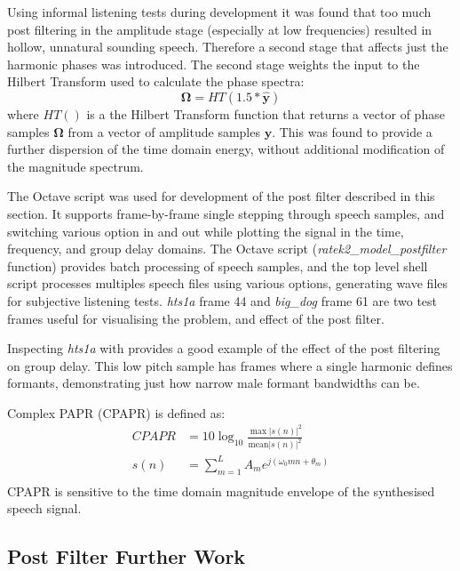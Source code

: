 \documentclass{article}
\begin{document}
Using informal listening tests during development it was found that too much post filtering in the amplitude stage (especially at low frequencies) resulted in hollow, unnatural sounding speech.  Therefore a second stage that affects just the harmonic phases was introduced. The second stage weights the input to the Hilbert Transform used to calculate the phase spectra:
\begin{equation}
\mathbf{\Omega}=HT(1.5*\hat{\mathbf{y}})
\end{equation}
where $HT()$ is a the Hilbert Transform function that returns a vector of phase samples $\mathbf{\Omega}$ from a vector of amplitude samples $\mathbf{y}$.  This was found to provide a further dispersion of the time domain energy, without additional modification of the magnitude spectrum.

The  Octave script was used for development of the post filter described in this section.  It supports frame-by-frame single stepping through speech samples, and switching various option in and out while plotting the signal in the time, frequency, and group delay domains.  The  Octave script (\emph{ratek2\_model\_postfilter} function) provides batch processing of speech samples, and the top level  shell script processes multiples speech files using various options, generating wave files for subjective listening tests. \emph{hts1a} frame 44 and \emph{big\_dog} frame 61 are two test frames useful for visualising the problem, and effect of the post filter.  

Inspecting \emph{hts1a} with  provides a good example of the effect of the post filtering on group delay.  This low pitch sample has frames where a single harmonic defines formants, demonstrating just how narrow male formant bandwidths can be.

Complex PAPR (CPAPR) is defined as:
\begin{equation}
\begin{split}
CPAPR &= 10\log_{10} \frac{ \max |s(n)|^2 }{ \textrm{mean} |s(n)|^2 } \\
s(n) &= \sum_{m=1}^{L}A_m e^{j(\omega_0mn+\theta_m)} \\
\end{split}
\end{equation}
CPAPR is sensitive to the time domain magnitude envelope of the synthesised speech signal.

\subsection{Post Filter Further Work}
\end{document}
